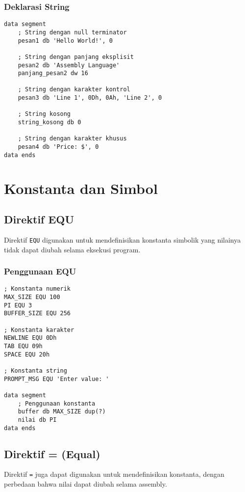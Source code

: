 \documentclass[../main.tex]{subfiles}
\begin{document}
\subsubsection{Deklarasi String}
\begin{lstlisting}[language={[x86masm]Assembler}, caption=Deklarasi String, label={lst:string-declaration}]
data segment
    ; String dengan null terminator
    pesan1 db 'Hello World!', 0
    
    ; String dengan panjang eksplisit
    pesan2 db 'Assembly Language'
    panjang_pesan2 dw 16
    
    ; String dengan karakter kontrol
    pesan3 db 'Line 1', 0Dh, 0Ah, 'Line 2', 0
    
    ; String kosong
    string_kosong db 0
    
    ; String dengan karakter khusus
    pesan4 db 'Price: $', 0
data ends
\end{lstlisting}

\section{Konstanta dan Simbol}

\subsection{Direktif EQU}
Direktif \texttt{EQU} digunakan untuk mendefinisikan konstanta simbolik yang nilainya tidak dapat diubah selama eksekusi program.

\subsubsection{Penggunaan EQU}
\begin{lstlisting}[language={[x86masm]Assembler}, caption=Penggunaan Direktif EQU, label={lst:equ-examples}]
; Konstanta numerik
MAX_SIZE EQU 100
PI EQU 3
BUFFER_SIZE EQU 256

; Konstanta karakter
NEWLINE EQU 0Dh
TAB EQU 09h
SPACE EQU 20h

; Konstanta string
PROMPT_MSG EQU 'Enter value: '

data segment
    ; Penggunaan konstanta
    buffer db MAX_SIZE dup(?)
    nilai db PI
data ends
\end{lstlisting}

\subsection{Direktif = (Equal)}
Direktif \texttt{=} juga dapat digunakan untuk mendefinisikan konstanta, dengan perbedaan bahwa nilai dapat diubah selama assembly.
\end{document}
